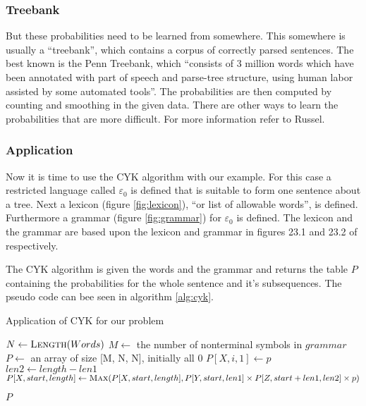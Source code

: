 \documentclass[12pt,twoside]{scrartcl}
\theoremstyle{plain}
\theoremstyle{definition}
\theoremstyle{remark}
\begin{document}
		\subsubsection*{Treebank}
		\label{subSubSec:treebank}
		
		But these probabilities need to be learned from somewhere. This somewhere is usually a ``treebank''\cite[p.~895]{Russel2010}, which contains a corpus of correctly parsed sentences. The best known is the Penn Treebank\cite{Russel2010}, which ``consists of 3 million words which have been annotated with part of speech and parse-tree structure, using human labor assisted by some automated tools''\cite[p.~895]{Russel2010}. The probabilities are then computed by counting and smoothing in the given data.\cite{Russel2010} There are other ways to learn the probabilities that are more difficult. For more information refer to Russel\cite{Russel2010}.
		
		\subsubsection*{Application}
		\label{subSubSec:application}
		
		Now it is time to use the CYK algorithm with our example. For this case a restricted language called $\varepsilon_{0}$ is defined that is suitable to form one sentence about a tree. Next a lexicon (figure \ref{fig:lexicon}), ``or list of allowable words''\cite[p.~890]{Russel2010}, is defined. Furthermore a grammar (figure \ref{fig:grammar}) for $\varepsilon_{0}$ is defined. The lexicon and the grammar are based upon the lexicon and grammar in figures 23.1 and 23.2 of \cite{Russel2010} respectively.
		
		The CYK algorithm is given the words and the grammar and returns the table $P$ containing the probabilities for the whole sentence and it's subsequences.\cite{Russel2010} The pseudo code can bee seen in algorithm \ref{alg:cyk}.
		
		\begin{algorithm}
			\caption{Application of CYK for our problem}
			\label{alg:cyk}
			\begin{algorithmic}[1]
					\State $N \gets \Call{Length}{Words}$
					\State $M \gets$ the number of nonterminal symbols in $grammar$
					\State $P \gets$ an array of size [M, N, N], initially all 0
							\State $P[X, i, 1] \gets p$
						\EndFor
					\EndFor
								\State $len2 \gets length - len1$
									\State $P[X, start, length] \gets \Call{Max}{P[X, start, length], P[Y, start, len1] \times P[Z, start + len1, len2] \times p}$
								
								\EndFor
							\EndFor
						\EndFor
					\EndFor
					\State \Return $P$
				\EndProcedure
			\end{algorithmic}
		\end{algorithm}
		
\end{document}
